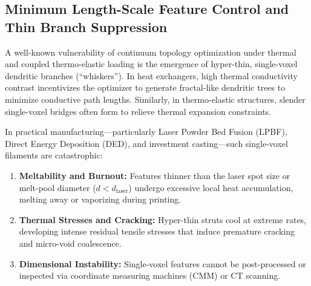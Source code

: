 \documentclass[11pt, a4paper]{article}
\begin{document}
\subsection{Minimum Length-Scale Feature Control and Thin Branch Suppression}
\label{sec:length_scale}
A well-known vulnerability of continuum topology optimization under thermal and coupled thermo-elastic loading is the emergence of hyper-thin, single-voxel dendritic branches (``whiskers''). In heat exchangers, high thermal conductivity contrast incentivizes the optimizer to generate fractal-like dendritic trees to minimize conductive path lengths. Similarly, in thermo-elastic structures, slender single-voxel bridges often form to relieve thermal expansion constraints.

In practical manufacturing---particularly Laser Powder Bed Fusion (LPBF), Direct Energy Deposition (DED), and investment casting---such single-voxel filaments are catastrophic:
\begin{enumerate}
    \item \textbf{Meltability and Burnout:} Features thinner than the laser spot size or melt-pool diameter ($d < d_{\text{laser}}$) undergo excessive local heat accumulation, melting away or vaporizing during printing.
    \item \textbf{Thermal Stresses and Cracking:} Hyper-thin struts cool at extreme rates, developing intense residual tensile stresses that induce premature cracking and micro-void coalescence.
    \item \textbf{Dimensional Instability:} Single-voxel features cannot be post-processed or inspected via coordinate measuring machines (CMM) or CT scanning.
\end{enumerate}
\end{document}
